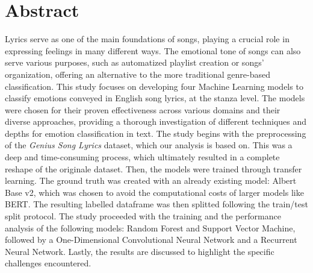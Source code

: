\firstchapter
\chapter*{Abstract}
\label{ch:abstract}
Lyrics serve as one of the main foundations of songs, playing a crucial role in expressing feelings in many different ways.
The emotional tone of songs can also serve various purposes, such as automatized playlist creation or songs' organization,
offering an alternative to the more traditional genre-based classification. This study focuses on developing four Machine Learning models
to classify emotions conveyed in English song lyrics, at the stanza level.
The models were chosen for their proven effectiveness across various domains and
their diverse approaches, providing a thorough investigation of different
techniques and depths for emotion classification in text. The study begins with the preprocessing of the \textit{Genius Song Lyrics} dataset, which our analysis is based on. 
This was a deep and time-consuming process, which ultimately resulted in a complete reshape of the originale dataset. 
Then, the models were trained through transfer learning. 
The ground truth was created with an already existing model: Albert Base v2, which was chosen to avoid the computational costs of larger models like BERT. The resulting labelled dataframe was then splitted following the train/test split protocol.
The study proceeded with the training and the performance analysis of the following models: Random Forest and Support Vector Machine, followed by a One-Dimensional Convolutional Neural Network and a Recurrent Neural Network. 
Lastly, the results are discussed to highlight the specific challenges encountered.